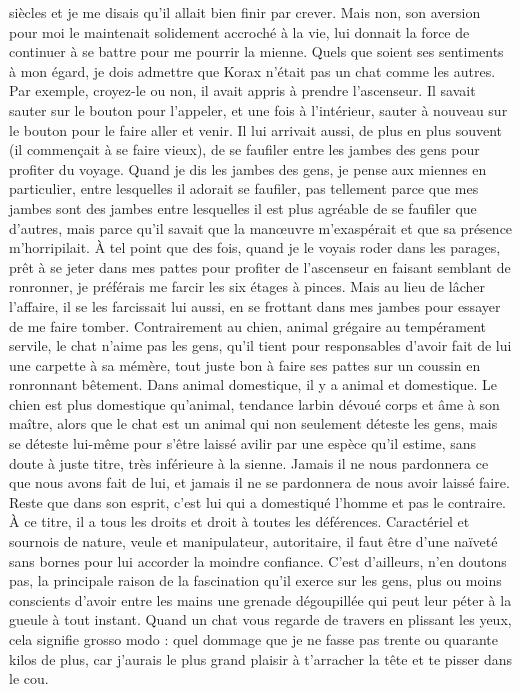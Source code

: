 siècles et je me disais qu’il allait bien finir par crever. Mais non, son aversion pour moi le maintenait solidement accroché à la vie, lui donnait la force de continuer à se battre pour me pourrir la mienne. Quels que soient ses sentiments à mon égard, je dois admettre que Korax n’était pas un chat comme les autres. Par exemple, croyez-le ou non, il avait appris à prendre l’ascenseur. Il savait sauter sur le bouton pour l’appeler, et une fois à l’intérieur, sauter à nouveau sur le bouton pour le faire aller et venir. Il lui arrivait aussi, de plus en plus souvent (il commençait à se faire vieux), de se faufiler entre les jambes des gens pour profiter du voyage. Quand je dis les jambes des gens, je pense aux miennes en particulier, entre lesquelles il adorait se faufiler, pas tellement parce que mes jambes sont des jambes entre lesquelles il est plus agréable de se faufiler que d’autres, mais parce qu’il savait que la manœuvre m’exaspérait et que sa présence m’horripilait. À tel point que des fois, quand je le voyais roder dans les parages, prêt à se jeter dans mes pattes pour profiter de l’ascenseur en faisant semblant de ronronner, je préférais me farcir les six étages à pinces. Mais au lieu de lâcher l’affaire, il se les farcissait lui aussi, en se frottant dans mes jambes pour essayer de me faire tomber. \label{rat:9}Contrairement au chien, animal grégaire au tempérament servile, le chat n’aime pas les gens, qu’il tient pour responsables d’avoir fait de lui une carpette à sa mémère, tout juste bon à faire ses pattes sur un coussin en ronronnant bêtement. Dans animal domestique, il y a animal et domestique. Le chien est plus domestique qu’animal, tendance larbin dévoué corps et âme à son maître, alors que le chat est un animal qui non seulement déteste les gens, mais se déteste lui-même pour s’être laissé avilir par une espèce qu’il estime, sans doute à juste titre, très inférieure à la sienne. Jamais il ne nous pardonnera ce que nous avons fait de lui, et jamais il ne se pardonnera de nous avoir laissé faire. Reste que dans son esprit, c’est lui qui a domestiqué l’homme et pas le contraire. À ce titre, il a tous les droits et droit à toutes les déférences. Caractériel et sournois de nature, veule et manipulateur, autoritaire, il faut être d’une naïveté sans bornes pour lui accorder la moindre confiance. C’est d’ailleurs, n’en doutons pas, la principale raison de la fascination qu’il exerce sur les gens, plus ou moins conscients d’avoir entre les mains une grenade dégoupillée qui peut leur péter à la gueule à tout instant. Quand un chat vous regarde de travers en plissant les yeux, cela signifie grosso modo : quel dommage que je ne fasse pas trente ou quarante kilos de plus, car j’aurais le plus grand plaisir à t’arracher la tête et te pisser dans le cou.

